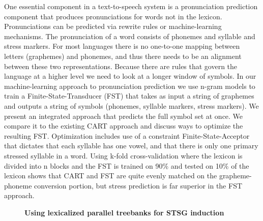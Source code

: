 \documentclass[10pt, a4paper, twopage, headinclude, footinclude, BCOR5mm]{scrartcl}
\begin{document}
        \begin{table}[t!]
    \end{table}

\noindent
One essential component in a text-to-speech system is a pronunciation prediction component that produces pronunciations for words not in the lexicon. Pronunciations can be predicted via rewrite rules or machine-learning mechanisms. The pronunciation of a word consists of phonemes and syllable and stress markers. For most languages there is no one-to-one mapping between letters (graphemes) and phonemes, and thus there needs to be an alignment between these two representations. Because there are rules that govern the language at a higher level we need to look at a longer window of symbols. In our machine-learning approach to pronunciation prediction we use n-gram models to train a Finite-State-Transducer (FST) that takes as input a string of graphemes and outputs a string of symbols (phonemes, syllable markers, stress markers). We present an integrated approach that predicts the full symbol set at once. We compare it to the existing CART approach and discuss ways to optimize the resulting FST. Optimization includes use of a constraint Finite-State-Acceptor that dictates that each syllable has one vowel, and that there is only one primary stressed syllable in a word. Using k-fold cross-validation where the lexicon is divided into n blocks and the FST is trained on 90\% and tested on 10\% of the lexicon shows that CART and FST are quite evenly matched on the grapheme-phoneme conversion portion, but stress prediction is far superior in the FST approach. 


\newpage

\begin{figure}[t!]
\centering
\large\textbf{Using lexicalized parallel treebanks for STSG induction}
\vspace*{0.5cm}
\end{figure}


        \begin{table}[t!]
    \end{table}
\end{document}
